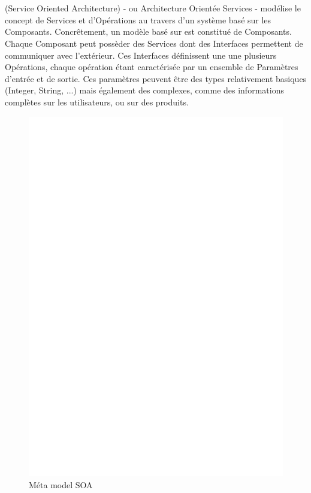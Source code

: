 \section{\kwsoa}\label{sub:soa}

\kwsoa (Service Oriented Architecture) - ou Architecture Orientée Services - modélise le concept de Services et d'Opérations au travers d'un système basé sur les Composants. Concrêtement, un modèle basé sur \kwsoa est constitué de Composants. Chaque Composant peut possèder des Services dont des Interfaces permettent de communiquer avec l'extérieur. Ces Interfaces définissent une une plusieurs Opérations, chaque opération étant caractérisée par un ensemble de Paramètres d'entrée et de sortie. Ces paramètres peuvent être des types relativement basiques (Integer, String, ...) mais également des  complexes, comme des informations complètes sur les utilisateurs, ou sur des produits.	

\begin{figure}[htb]
  \centering
  \includegraphics[scale=.3]{img/SOA.eps}
  \caption{Méta model SOA}
  \label{fig:soa}
\end{figure}

